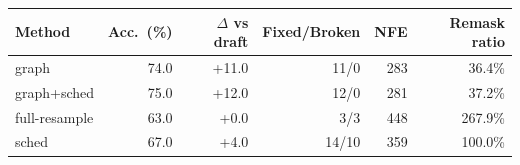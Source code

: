 \begin{tabular}{lrrrrr}
\toprule
Method & Acc.\ (\%) & $\Delta$ vs draft & Fixed/Broken & NFE & Remask ratio \\
\midrule
graph & 74.0 & +11.0 & 11/0 & 283 & 36.4\% \\
graph+sched & 75.0 & +12.0 & 12/0 & 281 & 37.2\% \\
full-resample & 63.0 & +0.0 & 3/3 & 448 & 267.9\% \\
sched & 67.0 & +4.0 & 14/10 & 359 & 100.0\% \\
\bottomrule
\end{tabular}
